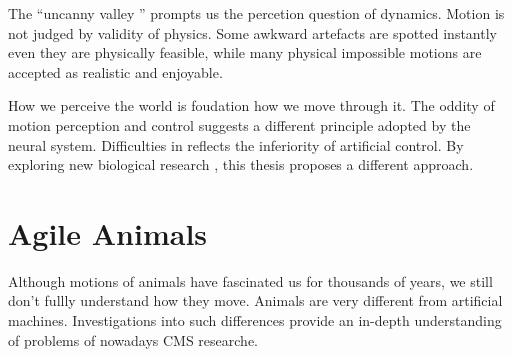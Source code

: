 The ``uncanny valley '' prompts us the percetion question of dynamics.
Motion is not judged by validity of physics.
Some awkward artefacts are spotted instantly even they are physically feasible, while many physical impossible motions are accepted as realistic and enjoyable. 

How we perceive the world is foudation how we move through it.
The oddity of motion perception and control suggests a different principle adopted by the neural system.
Difficulties in \cms reflects the inferiority of artificial control.
By exploring new biological research , this thesis proposes a different approach.

 

\section{Agile Animals}
Although motions of animals have fascinated us for thousands of years, we still don't fullly understand how they move.
Animals are very different from artificial machines.
Investigations into such differences provide an in-depth understanding of problems of nowadays CMS researche.

